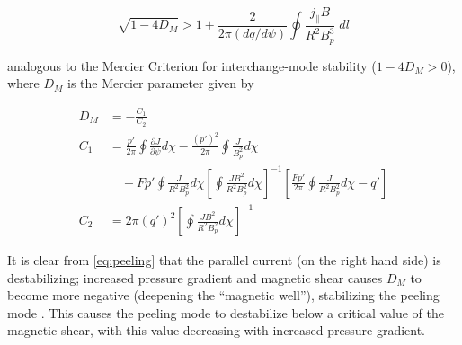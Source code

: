 \begin{equation}\label{eq:peeling}
 \sqrt{1 - 4D_M} > 1 + \frac{2}{2\pi \left(dq/d\psi\right)} \oint \frac{j_\parallel B}{R^2 B_p^3} \;dl
\end{equation}

\noindent analogous to the Mercier Criterion \cite{Mercier1960} for interchange-mode stability ($1 - 4D_M > 0$), where $D_M$ is the Mercier parameter given by

\begin{equation}\label{eq:mercier}
 \begin{aligned}
  D_M &= -\frac{C_1}{C_2}\\
  C_1 &= \frac{p'}{2\pi} \oint \frac{\partial J}{\partial \psi} d\chi - \frac{\left(p'\right)^2}{2\pi} \oint \frac{J}{B_p^2} d\chi\\
  &\quad + Fp' \oint \frac{J}{R^2 B_p^2} d\chi \left[ \oint \frac{JB^2}{R^2 B_p^2} d\chi \right]^{-1} \left[ \frac{Fp'}{2\pi} \oint \frac{J}{R^2 B_p^2} d\chi - q' \right]\\
  C_2 &= 2\pi\left(q'\right)^2 \left[ \oint \frac{JB^2}{R^2 B_p^2} d\chi \right]^{-1}
 \end{aligned}
\end{equation}

\noindent It is clear from \cref{eq:peeling} that the parallel current (on the right hand side) is destabilizing; increased pressure gradient and magnetic shear causes $D_M$ to become more negative (deepening the ``magnetic well''), stabilizing the peeling mode \cite{Snyder2002,Snyder2004}.  This causes the peeling mode to destabilize below a critical value of the magnetic shear, with this value decreasing with increased pressure gradient.

